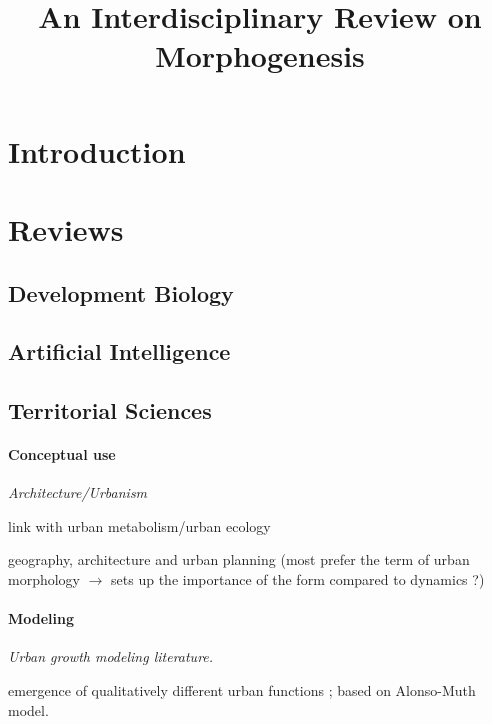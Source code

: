 \documentclass{article}
\begin{document}
\title{An Interdisciplinary Review on Morphogenesis}
\date{}

\maketitle

\section{Introduction}





\section{Reviews}

\subsection{Development Biology}

\subsection{Artificial Intelligence}


\subsection{Territorial Sciences}

\paragraph{Conceptual use}

\textit{Architecture/Urbanism}

\cite{olsen1982urban} link with urban metabolism/urban ecology

\cite{moudon1997urban} geography, architecture and urban planning (most prefer the term of urban morphology $\rightarrow$ sets up the importance of the form compared to dynamics ?)


\paragraph{Modeling}

\textit{Urban growth modeling literature.}

\cite{bonin2012modele} emergence of qualitatively different urban functions ; based on Alonso-Muth model.
\end{document}
